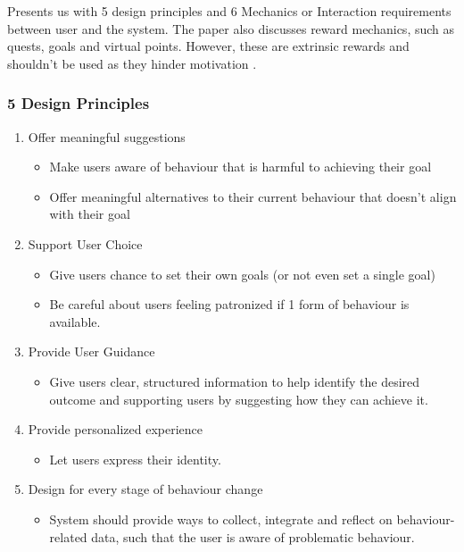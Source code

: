   Presents us with 5 design principles and 6 Mechanics or Interaction requirements between user and the system. The paper also discusses reward mechanics, such as quests, goals and virtual points. However, these are extrinsic rewards and shouldn't be used as they hinder motivation \cite{article_beyond_self_tracking_designing_apps}.

  \subsubsection*{5 Design Principles}

    \begin{enumerate}

    \item Offer meaningful suggestions
      \begin{itemize}
        \item Make users aware of behaviour that is harmful to achieving their goal
        \item Offer meaningful alternatives to their current behaviour that doesn't align with their goal
      \end{itemize}

    \item Support User Choice
      \begin{itemize}
        \item Give users chance to set their own goals (or not even set a single goal)
        \item Be careful about users feeling patronized if 1 form of behaviour is available.
      \end{itemize}

    \item Provide User Guidance
      \begin{itemize}
        \item Give users clear, structured information to help identify the desired outcome and supporting users by suggesting how they can achieve it.
      \end{itemize}

    \item Provide personalized experience
      \begin{itemize}
        \item Let users express their identity.
      \end{itemize}

    \item Design for every stage of behaviour change
      \begin{itemize}
        \item System should provide ways to collect, integrate and reflect on behaviour-related data, such that the user is aware of problematic behaviour.
      \end{itemize}

    \end{enumerate}

